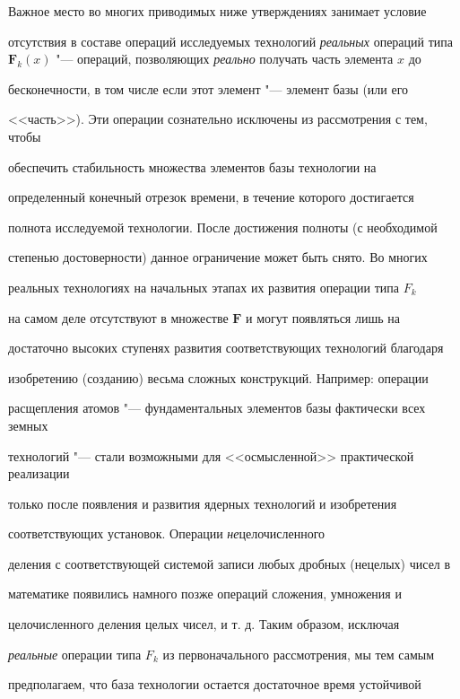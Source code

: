 \smallskip



Важное место во многих приводимых ниже утверждениях занимает условие

отсутствия в составе операций исследуемых технологий {\sl реальных} операций типа $\mathbf

{F}_{k}(x)$ "--- операций, позволяющих {\sl реально} получать часть элемента $x$ до

бесконечности, в том числе если этот элемент "--- элемент базы (или его

<<часть>>). Эти операции сознательно исключены из рассмотрения с тем, чтобы

обеспечить стабильность множества элементов базы технологии на

определенный конечный отрезок времени, в течение которого достигается

полнота исследуемой технологии. После достижения полноты (с необходимой

степенью достоверности) данное ограничение может быть снято. Во многих

реальных технологиях на начальных этапах их развития операции типа $F_{k}$

на самом деле отсутствуют в множестве $\mathbf{F}$ и могут появляться лишь на

достаточно высоких ступенях развития соответствующих технологий благодаря

изобретению (созданию) весьма сложных конструкций. Например: операции

расщепления атомов "--- фундаментальных элементов базы фактически всех земных

технологий "--- стали возможными для <<осмысленной>> практической реализации

только после появления и развития ядерных технологий и изобретения

соответствующих установок. Операции {\sl не}целочисленного

деления с соответствующей системой записи любых дробных (нецелых) чисел в

математике появились намного позже операций сложения, умножения и

целочисленного деления целых чисел, и т. д. Таким образом, исключая

{\sl реальные} операции типа $F_{k}$ из первоначального рассмотрения, мы тем самым

предполагаем, что база технологии остается достаточное время устойчивой

